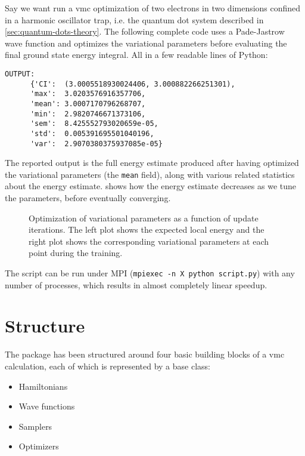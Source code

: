\documentclass[Thesis.tex]{subfiles}
\begin{document}
Say we want run a \gls{vmc} optimization of two electrons in two
dimensions confined in a harmonic oscillator trap, i.e. the quantum dot system
described in \cref{sec:quantum-dots-theory}. The following complete code uses a
Pade-Jastrow wave function and optimizes the variational parameters before
evaluating the final ground state energy integral. All in
a few readable lines of Python:\\



\begin{lstlisting}[basicstyle=\scriptsize]
  OUTPUT:
      {'CI':  (3.0005518930024406, 3.000882266251301),
      'max':  3.0203576916357706,
      'mean': 3.0007170796268707,
      'min':  2.9820746671373106,
      'sem':  8.425552793020659e-05,
      'std':  0.005391695501040196,
      'var':  2.9070380375937085e-05}
\end{lstlisting}
The reported output is the full energy estimate produced after having optimized
the variational parameters (the \texttt{mean} field), along with various related
statistics about the energy estimate.  shows how the
energy estimate decreases as we tune the parameters, before eventually converging.
\begin{figure}[h]
  \centering
  \resizebox{\linewidth}{!}{%
      
  }
  \caption[Learning progression of an example \gls{vmc}
  optimization]{Optimization of variational parameters as a function of update
    iterations. The left plot shows the expected local energy and the right plot
    shows the corresponding variational parameters at each point during the training.}
  \label{fig:quickstart-example}
\end{figure}

\noindent The script can be run under MPI (\texttt{mpiexec -n X python script.py}) with any number of processes, which results in almost completely linear speedup.

\section{Structure}

The package has been structured around four basic building blocks of a \gls{vmc}
calculation, each of which is represented by a base class:

\begin{itemize}
\item Hamiltonians
\item Wave functions
\item Samplers
\item Optimizers
\end{itemize}
\end{document}
